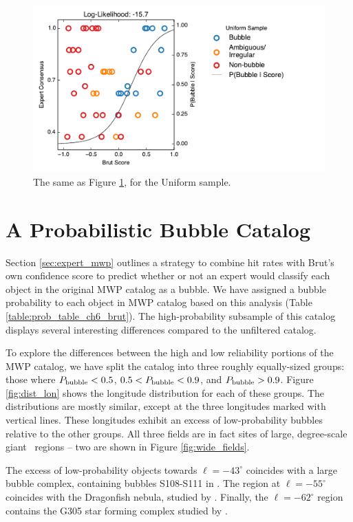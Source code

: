 \begin{figure}
\includegraphics{expert_uniform_score}
\caption{The same as Figure \ref{fig:expert_uniform_score}, for the Uniform sample.}
\label{fig:expert_uniform_score}
\end{figure}

\section{A Probabilistic Bubble Catalog}
\label{sec:prob}
Section \ref{sec:expert_mwp} outlines a strategy to combine hit rates with Brut's own confidence score to predict whether or not
an expert would classify each object in the original MWP catalog as a bubble. We have assigned a bubble probability to each
object in MWP catalog based on this analysis (Table \ref{table:prob_table_ch6_brut}). The high-probability subsample of this catalog displays several interesting differences compared to the unfiltered catalog.

To explore the differences between the high and low reliability portions of the MWP catalog, we have split the catalog into three roughly equally-sized groups: those where $P_{\rm bubble} < 0.5$, $0.5 < P_{\rm bubble} < 0.9$,
and $P_{\rm bubble} > 0.9$. Figure \ref{fig:dist_lon} shows the longitude distribution for each of these groups. The distributions are mostly similar, except at the three longitudes marked with vertical lines. These longitudes exhibit an excess of low-probability bubbles relative to the other groups.  All three fields are in fact sites of large, degree-scale giant \hii\, regions -- two are shown in Figure \ref{fig:wide_fields}.

The excess of low-probability objects towards $\ell=-43^\circ$ coincides with a large bubble complex, containing bubbles S108-S111 in \cite{Churchwell06}. The region at $\ell=-55^\circ$ coincides with the Dragonfish nebula, studied by \cite{Rahman11}. Finally, the $\ell=-62^\circ$ region contains the G305 star forming complex studied by \cite{Hindson12}.

